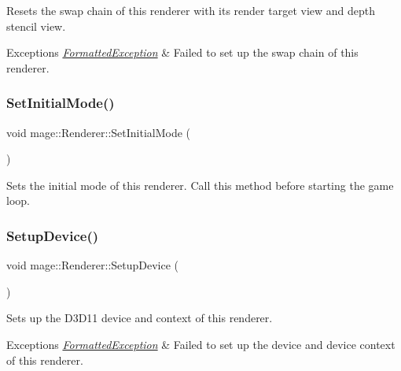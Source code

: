 Resets the swap chain of this renderer with its render target view and depth stencil view.


\begin{DoxyExceptions}{Exceptions}
{\em \hyperlink{structmage_1_1_formatted_exception}{Formatted\+Exception}} & Failed to set up the swap chain of this renderer. \\
\hline
\end{DoxyExceptions}
\hypertarget{classmage_1_1_renderer_aff4e08af2ab697c53f1ede6546a86d19}{}\label{classmage_1_1_renderer_aff4e08af2ab697c53f1ede6546a86d19} 
\subsubsection{\texorpdfstring{Set\+Initial\+Mode()}{SetInitialMode()}}
{\footnotesize\ttfamily void mage\+::\+Renderer\+::\+Set\+Initial\+Mode (\begin{DoxyParamCaption}{ }\end{DoxyParamCaption})\hspace{0.3cm}{\ttfamily [noexcept]}}

Sets the initial mode of this renderer. Call this method before starting the game loop. \hypertarget{classmage_1_1_renderer_aedf5e2e3f73d3d05c09c5fc9f8ac06c3}{}\label{classmage_1_1_renderer_aedf5e2e3f73d3d05c09c5fc9f8ac06c3} 
\subsubsection{\texorpdfstring{Setup\+Device()}{SetupDevice()}}
{\footnotesize\ttfamily void mage\+::\+Renderer\+::\+Setup\+Device (\begin{DoxyParamCaption}{ }\end{DoxyParamCaption})\hspace{0.3cm}{\ttfamily [private]}}

Sets up the D3\+D11 device and context of this renderer.


\begin{DoxyExceptions}{Exceptions}
{\em \hyperlink{structmage_1_1_formatted_exception}{Formatted\+Exception}} & Failed to set up the device and device context of this renderer. \\
\hline
\end{DoxyExceptions}
\hypertarget{classmage_1_1_renderer_ae69efac8c058f25f1c5d409c4ec7ff6e}{}\label{classmage_1_1_renderer_ae69efac8c058f25f1c5d409c4ec7ff6e} 
